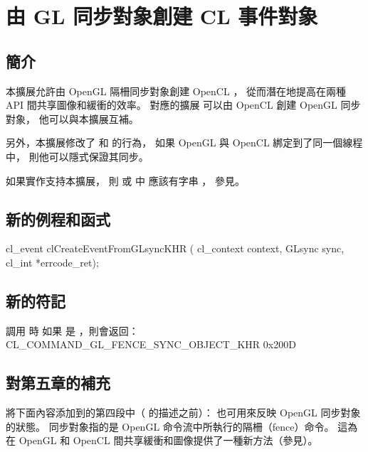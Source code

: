 \section{由 GL 同步對象創建 CL 事件對象}

\subsection{簡介}

本擴展允許由 OpenGL 隔柵同步對象創建 OpenCL ，
從而潛在地提高在兩種 API 間共享圖像和緩衝的效率。
對應的擴展  可以由 OpenCL 創建 OpenGL 同步對象，
他可以與本擴展互補。

另外，本擴展修改了  和  的行為，
如果 OpenGL  與 OpenCL  綁定到了同一個線程中，
則他可以隱式保證其同步。

如果實作支持本擴展，
則  或  中
應該有字串 ，
參見。

\subsection{新的例程和函式}


\startCLFUNC
cl_event clCreateEventFromGLsyncKHR (
			cl_context context,
			GLsync sync,
			cl_int *errcode_ret);
\stopCLFUNC

\subsection{新的符記}

調用  時
如果  是 ，則會返回：
\startclc
CL_COMMAND_GL_FENCE_SYNC_OBJECT_KHR	0x200D
\stopclc

\subsection{對第五章的補充}

將下面內容添加到的第四段中（ 的描述之前）：
\startreplacepar
{}也可用來反映 OpenGL 同步對象的狀態。
同步對象指的是 OpenGL 命令流中所執行的隔柵（fence）命令。
這為在 OpenGL 和 OpenCL 間共享緩衝和圖像提供了一種新方法（參見）。
\stopreplacepar

